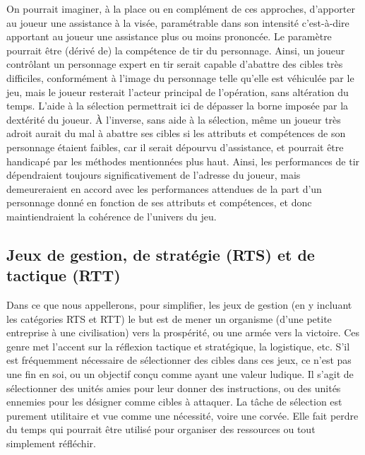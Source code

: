 	On pourrait imaginer, à la place ou en complément de ces approches, d'apporter au joueur une assistance à la visée, paramétrable dans son \og intensité \fg{} c'est-à-dire apportant au joueur une assistance plus ou moins prononcée. Le paramètre pourrait être (dérivé de) la compétence de tir du personnage. Ainsi, un joueur contrôlant un personnage expert en tir serait capable d'abattre des cibles très difficiles, conformément à l'image du personnage telle qu'elle est véhiculée par le jeu, mais le joueur resterait l'acteur principal de l'opération, sans altération du temps. L'aide à la sélection permettrait ici de dépasser la \og borne \fg{} imposée par la dextérité du joueur. À l'inverse, sans aide à la sélection, même un joueur très adroit aurait du mal à abattre ses cibles si les attributs et compétences de son personnage étaient faibles, car il serait dépourvu d'assistance, et pourrait être handicapé par les méthodes mentionnées plus haut. Ainsi, les performances de tir dépendraient toujours significativement de l'adresse du joueur, mais demeureraient en accord avec les performances attendues de la part d'un personnage donné en fonction de ses attributs et compétences, et donc maintiendraient la cohérence de l'univers du jeu.	
	
	\subsection{Jeux de gestion, de stratégie (RTS) et de tactique (RTT)}
	Dans ce que nous appellerons, pour simplifier, les jeux de gestion (en y incluant les catégories RTS et RTT) le but est de mener un organisme (d'une petite entreprise à une civilisation) vers la prospérité, ou une armée vers la victoire. Ces genre met l'accent sur la réflexion tactique et stratégique, la logistique, etc. S'il est fréquemment nécessaire de sélectionner des cibles dans ces jeux, ce n'est pas une fin en soi, ou un objectif conçu comme ayant une valeur ludique. Il s'agit de sélectionner des unités amies pour leur donner des instructions, ou des unités ennemies pour les désigner comme cibles à attaquer. La tâche de sélection est purement utilitaire et vue comme une nécessité, voire une corvée. Elle fait perdre du temps qui pourrait être utilisé pour organiser des ressources ou tout simplement réfléchir.
	
